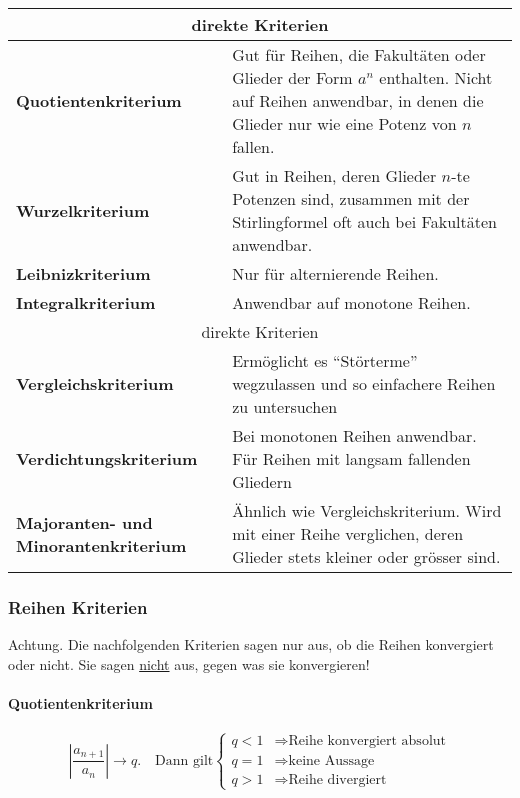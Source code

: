 \begin{tabular}{|p{4cm}|p{15cm}|}\hline
\multicolumn{2}{|c|}{direkte Kriterien}\\ \hline

\textbf{Quotientenkriterium} & Gut für Reihen, die Fakultäten oder Glieder der
Form $a^n$ enthalten. Nicht auf Reihen anwendbar, in denen die Glieder nur wie
eine Potenz von $n$ fallen. \\ \hline

\textbf{Wurzelkriterium} & Gut in Reihen, deren Glieder $n$-te Potenzen sind,
zusammen mit der Stirlingformel oft auch bei Fakultäten anwendbar. \\ \hline

\textbf{Leibnizkriterium} & Nur für alternierende Reihen.\\ \hline

\textbf{Integralkriterium} & Anwendbar auf monotone Reihen.\\ \hline

\multicolumn{2}{|c|}{direkte Kriterien}\\ \hline

\textbf{Vergleichskriterium} & Ermöglicht es "`Störterme"' wegzulassen und so
einfachere Reihen zu untersuchen \\ \hline

\textbf{Verdichtungskriterium} & Bei monotonen Reihen anwendbar. Für Reihen mit
langsam fallenden Gliedern \\ \hline

\textbf{Majoranten- und Minorantenkriterium} & Ähnlich wie Vergleichskriterium.
Wird mit einer Reihe verglichen, deren Glieder stets kleiner oder grösser sind.
\\ \hline
\end{tabular}

\twocolumn

\subsubsection{Reihen Kriterien}
Achtung. Die nachfolgenden Kriterien sagen nur aus, ob die Reihen konvergiert
oder nicht. Sie sagen \underline{nicht} aus, gegen was sie konvergieren!

\paragraph{Quotientenkriterium}
\[
\left| \frac{a_{n+1}}{a_n} \right| \to q. \quad \text{Dann gilt} \begin{cases}
q < 1 & \Rightarrow \text{Reihe konvergiert absolut} \\
q = 1 & \Rightarrow \text{keine Aussage}\\
q > 1 & \Rightarrow \text{Reihe divergiert}
\end{cases}
\]
